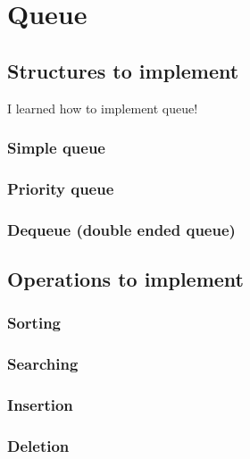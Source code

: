 \section{Queue}


\subsection{Structures to implement}

I learned how to implement queue! 

\subsubsection{Simple queue}

\subsubsection{Priority queue}

\subsubsection{Dequeue (double ended queue)}

\subsection{Operations to implement}

\subsubsection{Sorting}

\subsubsection{Searching}

\subsubsection{Insertion}

\subsubsection{Deletion}

\newpage
